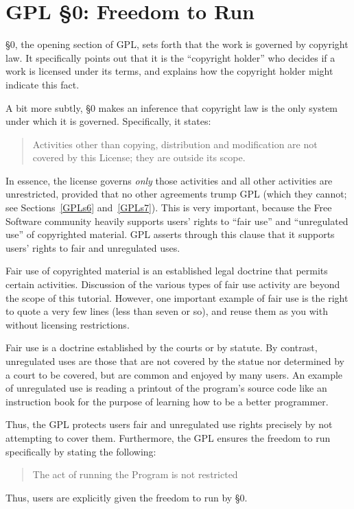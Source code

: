\documentclass[12pt]{report}
\begin{document}
\section{GPL \S 0: Freedom to Run}
\label{GPLs0}

\S 0, the opening section of GPL, sets forth that the work is governed by
copyright law.  It specifically points out that it is the ``copyright
holder'' who decides if a work is licensed under its terms, and explains
how the copyright holder might indicate this fact.

A bit more subtly, \S 0 makes an inference that copyright law is the only
system under which it is governed.  Specifically, it states:
\begin{quote}
Activities other than copying, distribution and modification are not
covered by this License; they are outside its scope.
\end{quote}
In essence, the license governs \emph{only} those activities and all other
activities are unrestricted, provided that no other agreements trump GPL
(which they cannot; see Sections~\ref{GPLs6} and~\ref{GPLs7}).  This is
very important, because the Free Software community heavily supports
users' rights to ``fair use'' and ``unregulated use'' of copyrighted
material.  GPL asserts through this clause that it supports users' rights
to fair and unregulated uses.

Fair use of copyrighted material is an established legal doctrine that
permits certain activities.  Discussion of the various types of fair use
activity are beyond the scope of this tutorial.  However, one important
example of fair use is the right to quote a very few lines (less than
seven or so), and reuse them as you with without licensing restrictions.

Fair use is a doctrine established by the courts or by statute.  By
contrast, unregulated uses are those that are not covered by the statue
nor determined by a court to be covered, but are common and enjoyed by
many users.  An example of unregulated use is reading a printout of the
program's source code like an instruction book for the purpose of learning
how to be a better programmer.

\medskip

Thus, the GPL protects users fair and unregulated use rights precisely by
not attempting to cover them.  Furthermore, the GPL ensures the freedom
to run specifically by stating the following:
\begin{quote}
The act of running the Program is not restricted
\end{quote}
Thus, users are explicitly given the freedom to run by \S 0.
\end{document}
